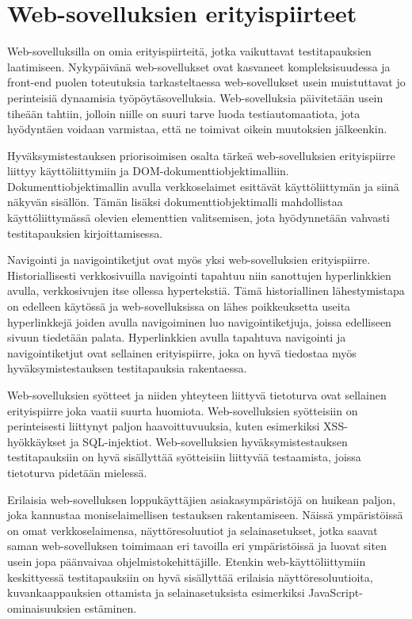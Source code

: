 \section{Web-sovelluksien erityispiirteet} \label{ch:08_websovelluksien_erityispiirteet}

  Web-sovelluksilla on omia erityispiirteitä, jotka vaikuttavat testitapauksien laatimiseen.
  Nykypäivänä web-sovellukset ovat kasvaneet kompleksisuudessa ja front-end puolen toteutuksia tarkasteltaessa web-sovellukset usein muistuttavat jo perinteisiä dynaamisia työpöytäsovelluksia.
  Web-sovelluksia päivitetään usein tiheään tahtiin, jolloin niille on suuri tarve luoda testiautomaatiota, jota hyödyntäen voidaan varmistaa, että ne toimivat oikein muutoksien jälkeenkin.

  Hyväksymistestauksen priorisoimisen osalta tärkeä web-sovelluksien erityispiirre liittyy käyttöliittymiin ja DOM-dokumenttiobjektimalliin.
  Dokumenttiobjektimallin avulla verkkoselaimet esittävät käyttöliittymän ja siinä näkyvän sisällön.
  Tämän lisäksi dokumenttiobjektimalli mahdollistaa käyttöliittymässä olevien elementtien valitsemisen, jota hyödynnetään vahvasti testitapauksien kirjoittamisessa.

  Navigointi ja navigointiketjut ovat myös yksi web-sovelluksien erityispiirre.
  Historiallisesti verkkosivuilla navigointi tapahtuu niin sanottujen hyperlinkkien avulla, verkkosivujen itse ollessa hypertekstiä.
  Tämä historiallinen lähestymistapa on edelleen käytössä ja web-sovelluksissa on lähes poikkeuksetta useita hyperlinkkejä joiden avulla navigoiminen luo navigointiketjuja, joissa edelliseen sivuun tiedetään palata.
  Hyperlinkkien avulla tapahtuva navigointi ja navigointiketjut ovat sellainen erityispiirre, joka on hyvä tiedostaa myös hyväksymistestauksen testitapauksia rakentaessa.

  Web-sovelluksien syötteet ja niiden yhteyteen liittyvä tietoturva ovat sellainen erityispiirre joka vaatii suurta huomiota.
  Web-sovelluksien syötteisiin on perinteisesti liittynyt paljon haavoittuvuuksia, kuten esimerkiksi XSS-hyökkäykset ja SQL-injektiot.
  Web-sovelluksien hyväksymistestauksen testitapauksiin on hyvä sisällyttää syötteisiin liittyvää testaamista, joissa tietoturva pidetään mielessä.

  Erilaisia web-sovelluksen loppukäyttäjien asiakasympäristöjä on huikean paljon, joka kannustaa moniselaimellisen testauksen rakentamiseen.
  Näissä ympäristöissä on omat verkkoselaimensa, näyttöresoluutiot ja selainasetukset, jotka saavat saman web-sovelluksen toimimaan eri tavoilla eri ympäristöissä ja luovat siten usein jopa päänvaivaa ohjelmistokehittäjille.
  Etenkin web-käyttöliittymiin keskittyessä testitapauksiin on hyvä sisällyttää erilaisia näyttöresoluutioita, kuvankaappauksien ottamista ja selainasetuksista esimerkiksi JavaScript-ominaisuuksien estäminen.

